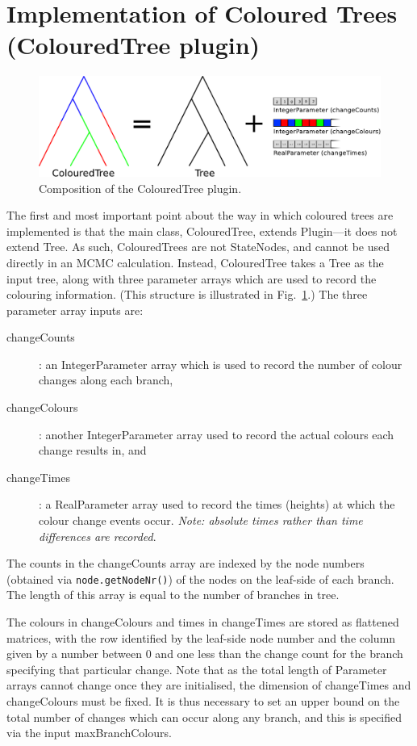 \documentclass[a4paper,11pt]{paper}
\newcommand{\class}[1]{\textsf{#1}}
\newcommand{\inp}[1]{\textsf{\color{blue}#1}}
\newcommand{\code}[1]{\texttt{#1}}
\begin{document}
\section{Implementation of Coloured Trees (ColouredTree plugin)}

\begin{figure}
	\centering
	\includegraphics[width=\textwidth]{treeComposition.pdf}
	\caption{Composition of the \class{ColouredTree} plugin.}
	\label{fig:ColouredTree}
\end{figure}

The first and most important point about the way in which coloured
trees are implemented is that the main class, \class{ColouredTree},
extends \class{Plugin}---it does not extend \class{Tree}.  As such,
\class{ColouredTree}s are not \class{StateNodes}, and cannot be used
directly in an MCMC calculation.  Instead, \class{ColouredTree} takes
a \class{Tree} as the input \inp{tree}, along with three parameter
arrays which are used to record the colouring information. (This
structure is illustrated in Fig.~\ref{fig:ColouredTree}.) The three
parameter array inputs are:
\begin{description}
	\item[\inp{changeCounts}]: an \class{IntegerParameter} array which
		is used to record the number of colour changes along each
		branch,
	\item[\inp{changeColours}]: another \class{IntegerParameter}
		array used to record the actual colours each change results
		in, and
	\item[\inp{changeTimes}]: a \class{RealParameter} array used to
		record the times (heights) at which the colour change events
		occur. \emph{Note: absolute times rather than time differences
		are recorded}.
\end{description}

The counts in the \inp{changeCounts} array are indexed by the node
numbers (obtained via \code{node.getNodeNr()}) of the nodes on the
leaf-side of each branch.  The length of this array is equal to the
number of branches in \inp{tree}.

The colours in \inp{changeColours} and times in \inp{changeTimes} are
stored as flattened matrices, with the row identified by the leaf-side
node number and the column given by a number between 0 and one less
than the change count for the branch specifying that particular
change. Note that as the total length of \class{Parameter} arrays
cannot change once they are initialised, the dimension of
\inp{changeTimes} and \inp{changeColours} must be fixed.  It is thus
necessary to set an upper bound on the total number of changes which
can occur along any branch, and this is specified via the input
\inp{maxBranchColours}.
\end{document}

